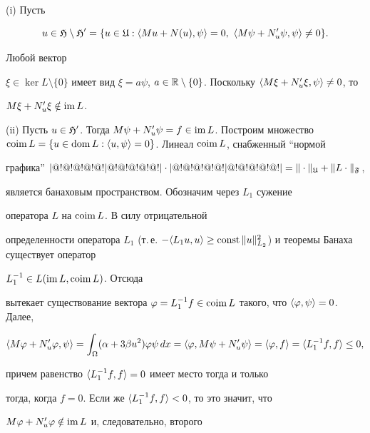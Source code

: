 \begin{pf}


(i) Пусть 


$$


u\in\frak H\setminus\frak H'=\{u\in\frak U:


\la Mu+N(u),\psi\ra =0,\ \la M\psi+N'_{u}\psi,\psi\ra\ne0\}.


$$


Любой вектор


$\xi\in\ker L\setminus\{0\}$ имеет вид $\xi=a\psi$, $a\in\Bbb


R\setminus\{0\}$. Поскольку $\la M\xi+N'_{u}\xi,\psi\ra\ne0$, то


$M\xi+N'_{u}\xi\notin\operatorname{im} L$.





(ii) Пусть $u\in\frak H'$. Тогда $M\psi+N'_{u}\psi=f\in


\im L$. Построим множество $\coim L=\{u\in\dom


L:\la u,\psi\ra =0\}$. Линеал $\coim L$, снабженный ``нормой


графика'' $|@!@!@!@!@!|@!@!@!@!@!|\cdot|@!@!@!@!@!|@!@!@!@!@!|=\|\cdot\|_{\frak U}+\|L\cdot\|_{\frak F}$,


является банаховым пространством. Обозначим через $L_{1}$ сужение


оператора $L$ на $\operatorname{coim} L$. В силу отрицательной


определенности оператора $L_{1}$ (т.\,е. $-\la L_{1}u,u\ra\geq


\const\|u\|^{2}_{L_{2}}$) и теоремы Банаха существует оператор


$L^{-1}_{1}\in L(\operatorname{im} L,\operatorname{coim} L)$. Отсюда


вытекает существование вектора $\varphi=L^{-1}_{1}f\in


\coim L$ такого, что $\la \varphi,\psi\ra =0$. Далее,


$$


\la M\varphi+N'_{u}\varphi,\psi\ra=\int_{\Omega}(\alpha+3\beta


u^{2})\varphi\psi \,dx=\la \varphi,M\psi+N'_{u}\psi\ra=


\la\varphi,f\ra=\la L^{-1}_{1}f,f\ra\leq0,


$$


причем равенство $\langle L^{-1}_{1}f,f\rangle=0$ имеет место тогда и только


тогда, когда $f=0$. Если же $\langle L^{-1}_{1}f,f\rangle<0$, то это значит, что


$M\varphi+N'_{u}\varphi\notin\operatorname{im} L$ и, следовательно, второго



\end{pf}
